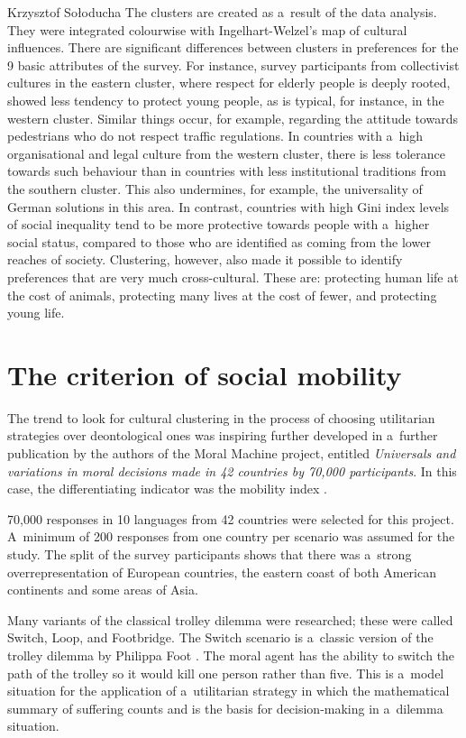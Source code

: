 \begin{artengenv}{Krzysztof Sołoducha}
The clusters are created as a~result of the data analysis. They were integrated colourwise with Ingelhart-Welzel's map of cultural influences. There are significant differences between clusters in preferences for the 9 basic attributes of the survey. For instance, survey participants from collectivist cultures in the eastern cluster, where respect for elderly people is deeply rooted, showed less tendency to protect young people, as is typical, for instance, in the western cluster. Similar things occur, for example, regarding the attitude towards pedestrians who do not respect traffic regulations. In countries with a~high organisational and legal culture from the western cluster, there is less tolerance towards such behaviour than in countries with less institutional traditions from the southern cluster. This also undermines, for example, the universality of German solutions in this area. In contrast, countries with high Gini index levels of social inequality tend to be more protective towards people with a~higher social status, compared to those who are identified as coming from the lower reaches of society. Clustering, however, also made it possible to identify preferences that are very much cross-cultural. These are: protecting human life at the cost of animals, protecting many lives at the cost of fewer, and protecting young life.

\section*{The criterion of social mobility}
The trend to look for cultural clustering in the process of choosing utilitarian strategies over deontological ones was inspiring further developed in a~further publication by the authors of the Moral Machine project, entitled \textit{Universals and variations in moral decisions made in 42 countries by 70,000 participants}. In this case, the differentiating indicator was the mobility index
\parencite[][]{awad_universals_2020}.%


70,000 responses in 10 languages from 42 countries were selected for this project. A~minimum of 200 responses from one country per scenario was assumed for the study. The split of the survey participants shows that there was a~strong overrepresentation of European countries, the eastern coast of both American continents and some areas of Asia.

Many variants of the classical trolley dilemma were researched; these were called Switch, Loop, and Footbridge. The Switch scenario is a~classic version of the trolley dilemma by Philippa Foot
\parencite*[][]{foot_problem_2002}. %
 The moral agent has the ability to switch the path of the trolley so it would kill one person rather than five. This is a~model situation for the application of a~utilitarian strategy in which the mathematical summary of suffering counts and is the basis for decision-making in a~dilemma situation.


\end{artengenv}
